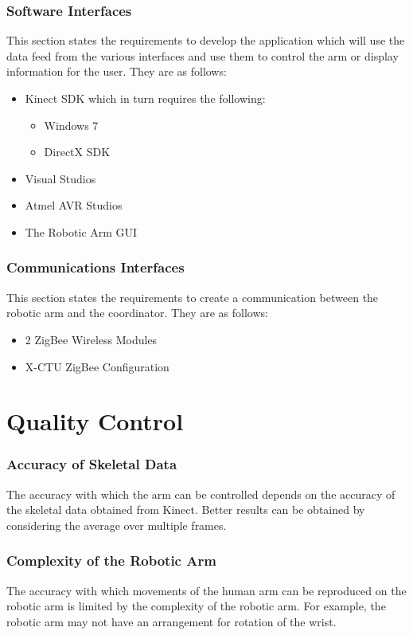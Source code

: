 \documentclass[a4wide]{scrreprt}
\begin{document}
\subsection{Software Interfaces}
This section states the requirements to develop the application which will use the data feed from the various interfaces and use them to control the arm or display information for the user. They are as follows:
\begin{itemize}
\item Kinect SDK which in turn requires the following:
\begin{itemize}
\item  Windows 7
\item  DirectX SDK
\end{itemize}
\item Visual Studios
\item Atmel AVR Studios
\item The Robotic Arm GUI
\end{itemize}

\subsection{Communications Interfaces}
This section states the requirements to create a communication between the robotic arm and the coordinator. They are as follows:
\begin{itemize}
\item 2 ZigBee Wireless Modules
\item X-CTU ZigBee Configuration
\end{itemize}

\chapter{Quality Control}
\subsection*{Accuracy of Skeletal Data}
The accuracy with which the arm can be controlled depends on the accuracy of the skeletal data obtained from Kinect. Better results can be obtained by considering the average over multiple frames.

\subsection*{Complexity of the Robotic Arm}
The accuracy with which movements of the human arm can be reproduced on the robotic arm is limited by the complexity of the robotic arm. For example, the robotic arm may not have an arrangement for rotation of the wrist.
\end{document}
